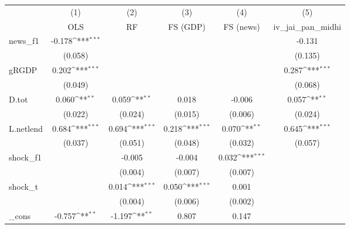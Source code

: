 {
\def\sym#1{\ifmmode^{#1}\else\(^{#1}\)\fi}
\begin{tabular}{l*{5}{c}}
\toprule
            &\multicolumn{1}{c}{(1)}&\multicolumn{1}{c}{(2)}&\multicolumn{1}{c}{(3)}&\multicolumn{1}{c}{(4)}&\multicolumn{1}{c}{(5)}\\
            &\multicolumn{1}{c}{OLS}&\multicolumn{1}{c}{RF}&\multicolumn{1}{c}{FS (GDP)}&\multicolumn{1}{c}{FS (news)}&\multicolumn{1}{c}{iv\_jai\_pan\_midhi}\\
\midrule
news\_f1     &      -0.178\sym{***}&                     &                     &                     &      -0.131         \\
            &     (0.058)         &                     &                     &                     &     (0.135)         \\
\addlinespace
gRGDP       &       0.202\sym{***}&                     &                     &                     &       0.287\sym{***}\\
            &     (0.049)         &                     &                     &                     &     (0.068)         \\
\addlinespace
D.tot       &       0.060\sym{**} &       0.059\sym{**} &       0.018         &      -0.006         &       0.057\sym{**} \\
            &     (0.022)         &     (0.024)         &     (0.015)         &     (0.006)         &     (0.024)         \\
\addlinespace
L.netlend   &       0.684\sym{***}&       0.694\sym{***}&       0.218\sym{***}&       0.070\sym{**} &       0.645\sym{***}\\
            &     (0.037)         &     (0.051)         &     (0.048)         &     (0.032)         &     (0.057)         \\
\addlinespace
shock\_f1    &                     &      -0.005         &      -0.004         &       0.032\sym{***}&                     \\
            &                     &     (0.004)         &     (0.007)         &     (0.007)         &                     \\
\addlinespace
shock\_t     &                     &       0.014\sym{***}&       0.050\sym{***}&       0.001         &                     \\
            &                     &     (0.004)         &     (0.006)         &     (0.002)         &                     \\
\addlinespace
\_cons      &      -0.757\sym{**} &      -1.197\sym{**} &       0.807         &       0.147         &                     \\

\end{tabular}}
